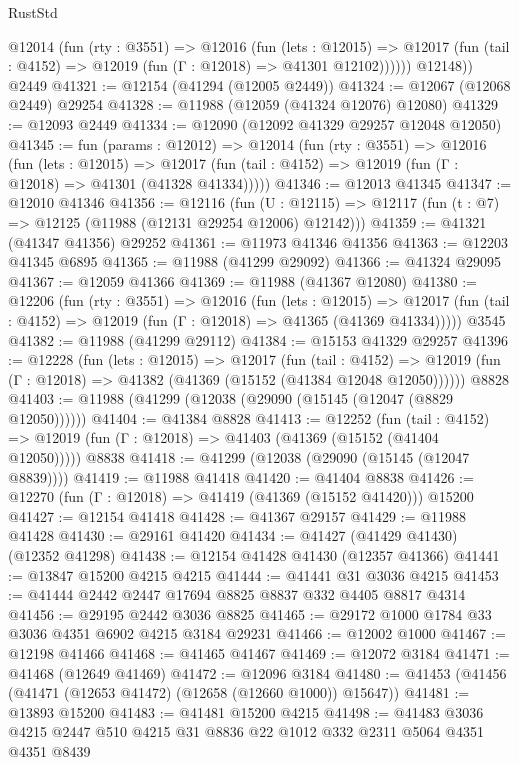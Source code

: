 \begin{lexlean}{RustStd}
\begin{coremodule}
          @12014
            (fun (rty : @3551) =>
            @12016
              (fun (lets : @12015) =>
              @12017 (fun (tail : @4152) => @12019 (fun (Γ : @12018) => @41301 @12102))))))
        @12148))
    @2449
@41321 := @12154 (@41294 (@12005 @2449))
@41324 := @12067 (@12068 @2449) @29254
@41328 := @11988 (@12059 (@41324 @12076) @12080)
@41329 := @12093 @2449
@41334 := @12090 (@12092 @41329 @29257 @12048 @12050)
@41345 := fun (params : @12012) =>
  @12014
    (fun (rty : @3551) =>
    @12016
      (fun (lets : @12015) =>
      @12017 (fun (tail : @4152) => @12019 (fun (Γ : @12018) => @41301 (@41328 @41334)))))
@41346 := @12013 @41345
@41347 := @12010 @41346
@41356 := @12116
    (fun (U : @12115) => @12117 (fun (t : @7) => @12125 (@11988 (@12131 @29254 @12006) @12142)))
@41359 := @41321 (@41347 @41356) @29252
@41361 := @11973 @41346 @41356
@41363 := @12203 @41345 @6895
@41365 := @11988 (@41299 @29092)
@41366 := @41324 @29095
@41367 := @12059 @41366
@41369 := @11988 (@41367 @12080)
@41380 := @12206
    (fun (rty : @3551) =>
    @12016
      (fun (lets : @12015) =>
      @12017 (fun (tail : @4152) => @12019 (fun (Γ : @12018) => @41365 (@41369 @41334)))))
    @3545
@41382 := @11988 (@41299 @29112)
@41384 := @15153 @41329 @29257
@41396 := @12228
    (fun (lets : @12015) =>
    @12017
      (fun (tail : @4152) =>
      @12019 (fun (Γ : @12018) => @41382 (@41369 (@15152 (@41384 @12048 @12050))))))
    @8828
@41403 := @11988 (@41299 (@12038 (@29090 (@15145 (@12047 (@8829 @12050))))))
@41404 := @41384 @8828
@41413 := @12252
    (fun (tail : @4152) => @12019 (fun (Γ : @12018) => @41403 (@41369 (@15152 (@41404 @12050)))))
    @8838
@41418 := @41299 (@12038 (@29090 (@15145 (@12047 @8839))))
@41419 := @11988 @41418
@41420 := @41404 @8838
@41426 := @12270 (fun (Γ : @12018) => @41419 (@41369 (@15152 @41420))) @15200
@41427 := @12154 @41418
@41428 := @41367 @29157
@41429 := @11988 @41428
@41430 := @29161 @41420
@41434 := @41427 (@41429 @41430) (@12352 @41298)
@41438 := @12154 @41428 @41430 (@12357 @41366)
@41441 := @13847 @15200 @4215 @4215
@41444 := @41441 @31 @3036 @4215
@41453 := @41444 @2442 @2447 @17694 @8825 @8837 @332 @4405 @8817 @4314
@41456 := @29195 @2442 @3036 @8825
@41465 := @29172 @1000 @1784 @33 @3036 @4351 @6902 @4215 @3184 @29231
@41466 := @12002 @1000
@41467 := @12198 @41466
@41468 := @41465 @41467
@41469 := @12072 @3184
@41471 := @41468 (@12649 @41469)
@41472 := @12096 @3184
@41480 := @41453 (@41456 (@41471 (@12653 @41472) (@12658 (@12660 @1000)) @15647))
@41481 := @13893 @15200
@41483 := @41481 @15200 @4215
@41498 := @41483 @3036 @4215 @2447 @510 @4215 @31 @8836 @22 @1012 @332 @2311 @5064 @4351 @4351 @8439

\end{coremodule}
\end{lexlean}
